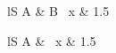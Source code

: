 \documentclass{article}
\begin{document}
\begin{tabular}{lS}
A & {B} \
x & 1.5 \
\end{tabular}
\begin{tabular}{lS}
A &  \
x & 1.5 \
\end{tabular}
\end{document}
